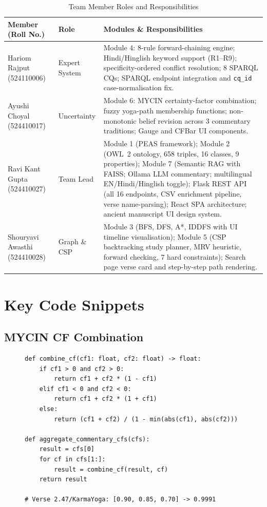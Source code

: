 \documentclass[conference]{IEEEtran}
\begin{document}
\begin{table}[!t]
\caption{Team Member Roles and Responsibilities}
\label{tab:tasks}
\centering
\begin{tabular}{p{3.0cm}p{2.0cm}p{10.5cm}}
\toprule
\textbf{Member (Roll No.)} & \textbf{Role} & \textbf{Modules \& Responsibilities} \\
\midrule
Hariom Rajput \newline (524110006)
  & Expert System
  & Module 4: 8-rule forward-chaining engine; Hindi/Hinglish keyword support (R1--R9); specificity-ordered conflict resolution; 8 SPARQL CQs; SPARQL endpoint integration and \texttt{cq\_id} case-normalisation fix. \\
\midrule
Ayushi Choyal \newline (524410017)
  & Uncertainty
  & Module 6: MYCIN certainty-factor combination; fuzzy yoga-path membership functions; non-monotonic belief revision across 3 commentary traditions; Gauge and CFBar UI components. \\
\midrule
Ravi Kant Gupta \newline (524410027)
  & Team Lead
  & Module 1 (PEAS framework); Module 2 (OWL~2 ontology, 658 triples, 16 classes, 9 properties); Module 7 (Semantic RAG with FAISS; Ollama LLM commentary; multilingual EN/Hindi/Hinglish toggle); Flask REST API (all 16 endpoints, CSV enrichment pipeline, verse name-parsing); React SPA architecture; ancient manuscript UI design system. \\
\midrule
Shouryavi Awasthi \newline (524410028)
  & Graph \& CSP
  & Module 3 (BFS, DFS, A*, IDDFS with UI timeline visualisation); Module 5 (CSP backtracking study planner, MRV heuristic, forward checking, 7 hard constraints); Search page verse card and step-by-step path rendering. \\
\bottomrule
\end{tabular}
\end{table}

\section{Key Code Snippets}

\subsection{MYCIN CF Combination}

\begin{figure}[!t]
\begin{lstlisting}[language=Python3, caption={MYCIN certainty factor combination}]
def combine_cf(cf1: float, cf2: float) -> float:
    if cf1 > 0 and cf2 > 0:
        return cf1 + cf2 * (1 - cf1)
    elif cf1 < 0 and cf2 < 0:
        return cf1 + cf2 * (1 + cf1)
    else:
        return (cf1 + cf2) / (1 - min(abs(cf1), abs(cf2)))

def aggregate_commentary_cfs(cfs):
    result = cfs[0]
    for cf in cfs[1:]:
        result = combine_cf(result, cf)
    return result

# Verse 2.47/KarmaYoga: [0.90, 0.85, 0.70] -> 0.9991
\end{lstlisting}
\end{figure}
\end{document}
